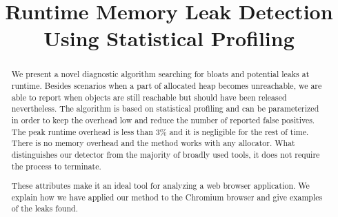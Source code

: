\documentclass[preprint, numbers]{sigplanconf}
\begin{document}
\setlength{\pdfpageheight}{\paperheight}
\setlength{\pdfpagewidth}{\paperwidth}




\title{Runtime Memory Leak Detection Using Statistical Profiling}
\subtitle{}

\iffalse
\authorinfo{Micha{\l} W{\l}odarczyk}%
           {University of Warsaw}
           {m.wlodarczyk@mimuw.edu.pl}
\authorinfo{Ben Cheng}
           {Google Inc.}
           {bccheng@google.com}
\authorinfo{Simon Que}
           {Google Inc.}
           {sque@google.com}
\fi
{}

\maketitle

\begin{abstract}
We present a novel diagnostic algorithm searching for bloats and potential
leaks at runtime.
Besides scenarios when a part of allocated heap becomes unreachable,
we are able to report when objects are still reachable but
should have been released nevertheless.
The algorithm is based on statistical profiling and can be parameterized in order to
keep the overhead low and reduce the number of reported false positives.
The peak runtime overhead is less than 3\% and it is negligible for the rest of time.
There is no memory overhead and the method works
with any allocator.
What distinguishes our detector from the majority of broadly used tools,
it does not require the process to terminate.

These attributes make it an ideal tool for analyzing a web browser application.
We explain how we have applied our method to the Chromium browser and give
examples of the leaks found.
\end{abstract}
\end{document}
